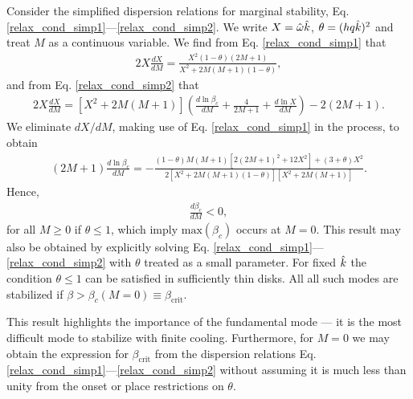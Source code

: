 Consider the simplified dispersion relations for marginal stability,
Eq. \ref{relax_cond_simp1}---\ref{relax_cond_simp2}. We write 
$X= \hat{\omega}\hat{k}$, $\theta = (hq\hat{k})^2$ and  
treat $M$ as a continuous variable. We find from
Eq. \ref{relax_cond_simp1} that  
\begin{align}
  2 X \frac{d X}{dM} = \frac{X^2(1-\theta)(2M+1)}{X^2 +
  2M(M+1)(1-\theta)}, 
\end{align}
and from Eq. \ref{relax_cond_simp2} that
\begin{align}
  2X\frac{dX}{dM} = \left[X^2 +
  2M(M+1)\right]\left(\frac{d\ln{\beta_c}}{dM} + \frac{4}{2M+1} +
  \frac{d\ln{X}}{dM}\right) - 2(2M+1). 
\end{align}
We eliminate $dX/dM$, making use of Eq. \ref{relax_cond_simp1} in the process, to obtain 
\begin{align}
  (2M+1)\frac{d\ln{\beta_c}}{dM} %
  = -\frac{(1-\theta)M(M+1)\left[ 2(2M+1)^2 + 12X^2\right]
  + (3+\theta)X^2}{2 \left[X^2 +
  2M(M+1)(1-\theta)\right]\left[X^2 + 2M(M+1)\right]}.  
\end{align}
Hence,
\begin{align}\label{dbeta_dm}
  \frac{d\beta_c}{dM}<0, 
\end{align}
for all $M\geq 0$ if $\theta\leq 1$, which imply 
$\mathrm{max}(\beta_c)$ occurs at $M=0$. This result may also be
obtained by explicitly solving 
Eq. \ref{relax_cond_simp1}---\ref{relax_cond_simp2} with $\theta$
treated as a small parameter. For fixed $\hat{k}$ the 
condition $\theta\leq 1$ can be satisfied in sufficiently thin disks.
All all such modes are stabilized if
$\beta>\beta_c(M=0)\equiv\beta_\mathrm{crit}$. 

This result highlights the importance of the fundamental mode  
--- it is the most difficult mode to stabilize with finite
cooling. Furthermore, for $M=0$ we may obtain the expression  
for $\beta_\mathrm{crit}$ from the dispersion relations 
Eq. \ref{relax_cond_simp1}---\ref{relax_cond_simp2} without  
assuming it is much less than unity from the onset or place
restrictions on $\theta$.  
 
